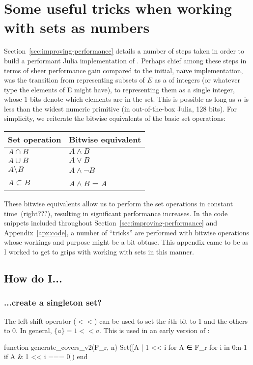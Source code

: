 \chapter{Some useful tricks when working with sets as numbers}
Section~\ref{sec:improving-performance} details a number of steps taken in order to build a performant Julia implementation of . Perhaps chief among these steps in terms of sheer performance gain compared to the initial, naïve implementation, was the transition from representing subsets of $E$ as a  of integers (or whatever type the elements of E might have), to representing them as a single integer, whose 1-bits denote which elements are in the set. This is possible as long as $n$ is less than the widest numeric primitive (in out-of-the-box Julia, 128 bits). For simplicity,  we reiterate the bitwise equivalents of the basic set operations:
\begin{table}[!ht]
  \centering
  \begin{tabular}{|l|l|}
  \hline
      Set operation   & Bitwise equivalent   \\\hline
      $A \cap B$      & $A \land B$       \\\hline
      $A \cup B$      & $A \lor B$        \\\hline
      $A \setminus B$ & $A \land \lnot B$   \\\hline
      $A \subseteq B$ & $A \land B$ = $A$ \\\hline
  \end{tabular}
\end{table}
These bitwise equivalents allow us to perform the set operations in constant time~(right???), resulting in significant performance increases. In the code snippets included throughout Section~\ref{sec:improving-performance} and Appendix~\ref{apx:code}, a number of ``tricks'' are performed with bitwise operations whose workings and purpose might be a bit obtuse. This appendix came to be as I worked to get to grips with working with sets in this manner.

\section*{How do I...}
\subsection*{...create a singleton set?}
The left-shift operator ($<<$) can be used to set the $i$th bit to 1 and the others to 0. In general, $\{a\} = 1<<a$. This is used in an early version of :
\begin{jllisting}
function generate_covers_v2(F_r, n)
  Set([A | 1 << i for A ∈ F_r for i in 0:n-1 if A & 1 << i === 0])
end
\end{jllisting}

